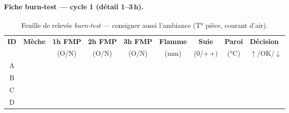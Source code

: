 \documentclass[../../main.tex]{subfiles}
\begin{document}
\paragraph{Fiche burn‑test — cycle 1 (détail 1--3\,h).}
\begin{table}[H]
  \centering
  \footnotesize
  \setlength{\tabcolsep}{3.8pt}
  \renewcommand{\arraystretch}{1.16}
  \begin{tabularx}{\textwidth}{c c c c c c c c X}
    \toprule
    \rowcolor{lightgray!35}
    \textbf{ID} & \textbf{Mèche} & \textbf{1h FMP} & \textbf{2h FMP} & \textbf{3h FMP} & \textbf{Flamme} & \textbf{Suie} & \textbf{Paroi} & \textbf{Décision} \\
     &  & (O/N) & (O/N) & (O/N) & (mm) & (0/+\,+) & (\si{\celsius}) & \(\uparrow\)/OK/\(\downarrow\) \\
    \midrule
    A &  &  &  &  &  &  &  &  \\
    B &  &  &  &  &  &  &  &  \\
    C &  &  &  &  &  &  &  &  \\
    D &  &  &  &  &  &  &  &  \\
    \bottomrule
  \end{tabularx}
  \caption{Feuille de relevés \textit{burn‑test} — consigner aussi l’ambiance (T° pièce, courant d’air).}
\end{table}

\ClearShipoutPictureBG
\end{document}
